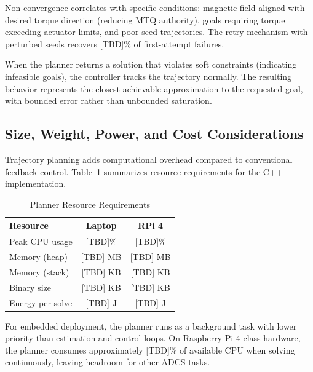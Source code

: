 \documentclass[conference]{IEEEtran}
\begin{document}
Non-convergence correlates with specific conditions: magnetic field aligned with desired torque direction (reducing MTQ authority), goals requiring torque exceeding actuator limits, and poor seed trajectories. The retry mechanism with perturbed seeds recovers [TBD]\% of first-attempt failures. %

When the planner returns a solution that violates soft constraints (indicating infeasible goals), the controller tracks the trajectory normally. The resulting behavior represents the closest achievable approximation to the requested goal, with bounded error rather than unbounded saturation.

\subsection{Size, Weight, Power, and Cost Considerations}\label{subsec:swap_c}

Trajectory planning adds computational overhead compared to conventional feedback control. Table~\ref{tab:swap_c} summarizes resource requirements for the C++ implementation.

\begin{table}[t]
    \centering
    \caption{Planner Resource Requirements}
    \label{tab:swap_c}
    \begin{tabular}{lcc}
        \toprule
        Resource & Laptop & RPi 4 \\
        \midrule
        Peak CPU usage & [TBD]\% & [TBD]\% \\
        Memory (heap) & [TBD] MB & [TBD] MB \\
        Memory (stack) & [TBD] KB & [TBD] KB \\
        Binary size & [TBD] KB & [TBD] KB \\
        Energy per solve & [TBD] J & [TBD] J \\
        \bottomrule
    \end{tabular}
\end{table}

For embedded deployment, the planner runs as a background task with lower priority than estimation and control loops. On Raspberry Pi 4 class hardware, the planner consumes approximately [TBD]\% of available CPU when solving continuously, leaving headroom for other ADCS tasks. %
\end{document}
